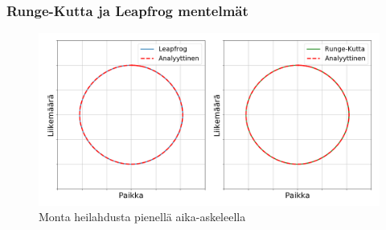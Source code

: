 \documentclass[finnish, 11pt, fleqn]{beamer}
\begin{document}
\begin{frame}
	\frametitle{Runge-Kutta ja Leapfrog mentelmät}
	\vspace{-1em}
	\begin{figure}[h!]
		\includegraphics[scale=0.27]{graphics/comp5.png}	
		{\caption{Monta heilahdusta pienellä aika-askeleella}}
	\end{figure}
\end{frame}
\end{document}
